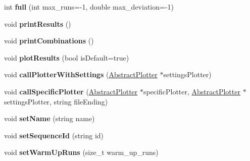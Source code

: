 \begin{DoxyCompactItemize}
\item 
\hypertarget{classAbstractBenchmark_a3d7225b10b48571d45bc32c0f28d2709}{int {\bfseries full} (int max\-\_\-runs=-\/1, double max\-\_\-deviation=-\/1)}\label{classAbstractBenchmark_a3d7225b10b48571d45bc32c0f28d2709}

\item 
\hypertarget{classAbstractBenchmark_a7a8d4262adf6991758e09939095069c2}{void {\bfseries print\-Results} ()}\label{classAbstractBenchmark_a7a8d4262adf6991758e09939095069c2}

\item 
\hypertarget{classAbstractBenchmark_adebb37bb53f1870bfdc5dcf43310b509}{void {\bfseries print\-Combinations} ()}\label{classAbstractBenchmark_adebb37bb53f1870bfdc5dcf43310b509}

\item 
\hypertarget{classAbstractBenchmark_a0448160d40b580d9f9215783b13b7248}{void {\bfseries plot\-Results} (bool is\-Default=true)}\label{classAbstractBenchmark_a0448160d40b580d9f9215783b13b7248}

\item 
\hypertarget{classAbstractBenchmark_abd22a883cf34c7b2af825be694ad1440}{void {\bfseries call\-Plotter\-With\-Settings} (\hyperlink{classAbstractPlotter}{Abstract\-Plotter} $\ast$settings\-Plotter)}\label{classAbstractBenchmark_abd22a883cf34c7b2af825be694ad1440}

\item 
\hypertarget{classAbstractBenchmark_aa72be0e243c3f9b8fcfc9e21078a62a6}{void {\bfseries call\-Specific\-Plotter} (\hyperlink{classAbstractPlotter}{Abstract\-Plotter} $\ast$specific\-Plotter, \hyperlink{classAbstractPlotter}{Abstract\-Plotter} $\ast$settings\-Plotter, string file\-Ending)}\label{classAbstractBenchmark_aa72be0e243c3f9b8fcfc9e21078a62a6}

\item 
\hypertarget{classAbstractBenchmark_a764c151515694b80269111e20a11147b}{void {\bfseries set\-Name} (string name)}\label{classAbstractBenchmark_a764c151515694b80269111e20a11147b}

\item 
\hypertarget{classAbstractBenchmark_ae9fa6ab0ace4057291d5ea1bf4090b9a}{void {\bfseries set\-Sequence\-Id} (string id)}\label{classAbstractBenchmark_ae9fa6ab0ace4057291d5ea1bf4090b9a}

\item 
\hypertarget{classAbstractBenchmark_a3edeff0335ac35ac29509f284df374e7}{void {\bfseries set\-Warm\-Up\-Runs} (size\-\_\-t warm\-\_\-up\-\_\-runs)}\label{classAbstractBenchmark_a3edeff0335ac35ac29509f284df374e7}


\end{DoxyCompactItemize}
